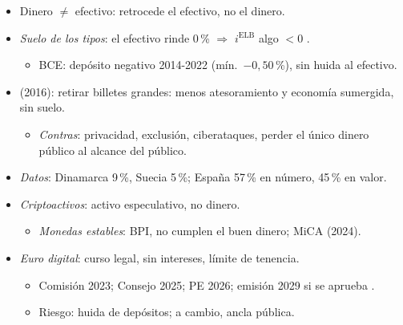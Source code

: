 \documentclass{article}
\begin{document}
\begin{columnas}
\begin{itemize}
\item Dinero $\neq$ efectivo: retrocede el efectivo, no el dinero.
\item \emph{Suelo de los tipos}: el efectivo rinde 0\,\% $\Rightarrow$  $i^{\mathrm{ELB}}$ algo $<0$ .
  \begin{itemize}
  \item BCE: depósito negativo 2014-2022 (mín.\ $-0{,}50$\,\%), sin huida al efectivo.
  \end{itemize}
\end{itemize}
\begin{itemize}
\item {} (2016): retirar billetes grandes: menos atesoramiento y economía sumergida, sin suelo.
  \begin{itemize}
  \item \emph{Contras}: privacidad, exclusión, ciberataques, perder el único dinero público al alcance del público.
  \end{itemize}
\item \emph{Datos}: Dinamarca 9\,\%, Suecia 5\,\%; España 57\,\% en número, 45\,\% en valor.
\end{itemize}
\begin{itemize}
\item \emph{Criptoactivos}: activo especulativo, no dinero.
  \begin{itemize}
  \item \emph{Monedas estables}: BPI, no cumplen el buen dinero; MiCA (2024).
  \end{itemize}
\item \emph{Euro digital}: curso legal, sin intereses, límite de tenencia.
  \begin{itemize}
  \item Comisión 2023; Consejo 2025; PE 2026; emisión 2029 si se aprueba .
  \item Riesgo: huida de depósitos; a cambio, ancla pública.
  \end{itemize}
\end{itemize}


\end{columnas}
\end{document}
